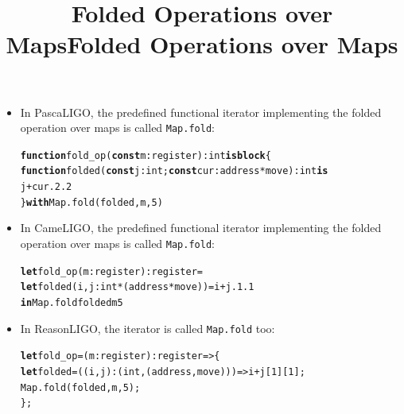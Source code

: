 \documentclass[wide]{slides}
\newcommand{\Kblock}[0]{\textbf{block}\xspace}
\newcommand{\Kconst}[0]{\textbf{const}\xspace}
\newcommand{\Kfunction}[0]{\textbf{function}\xspace}
\newcommand{\Kin}[0]{\textbf{in}\xspace}
\newcommand{\Kis}[0]{\textbf{is}\xspace}
\newcommand{\Kwith}[0]{\textbf{with}\xspace}
\newcommand{\Klet}[0]{\textbf{let}\xspace}
\begin{document}
\begin{slide}
  \title{Folded Operations over Maps}

  \begin{itemize}

    \item In PascaLIGO, the predefined functional iterator
      implementing the folded operation over maps is called
      \texttt{Map.fold}:
      \begin{alltt}
\Kfunction fold_op (\Kconst m : register) : int \Kis \Kblock \{
  \Kfunction folded (\Kconst j: int; \Kconst cur: address*move) : int \Kis
    j + cur.2.2
  \} \Kwith Map.fold (folded, m, 5)
      \end{alltt}

  \end{itemize}

\end{slide}

\begin{slide}
  \title{Folded Operations over Maps}

  \begin{itemize}

    \item In CameLIGO, the predefined functional iterator implementing
      the folded operation over maps is called \texttt{Map.fold}:
      \begin{alltt}
\Klet fold_op (m : register) : register =
  \Klet folded (i,j : int * (address * move)) = i + j.1.1
  \Kin Map.fold folded m 5
      \end{alltt}

    \item In ReasonLIGO, the iterator is called \texttt{Map.fold} too:
      \begin{alltt}
\Klet fold_op = (m : register) : register => \{
  \Klet folded = ((i,j): (int, (address, move))) => i + j[1][1];
  Map.fold (folded, m, 5);
\};
      \end{alltt}

  \end{itemize}

\end{slide}
\end{document}

